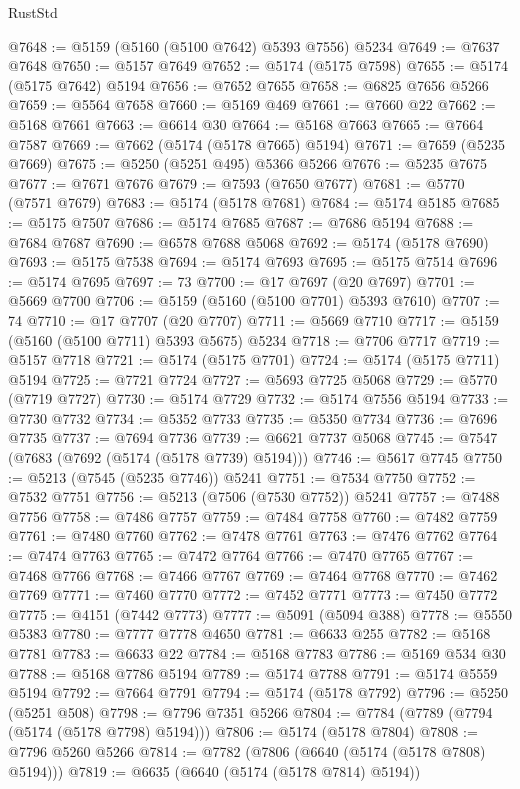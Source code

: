\begin{lexlean}{RustStd}
\begin{coremodule}
@7648 := @5159 (@5160 (@5100 @7642) @5393 @7556) @5234
@7649 := @7637 @7648
@7650 := @5157 @7649
@7652 := @5174 (@5175 @7598)
@7655 := @5174 (@5175 @7642) @5194
@7656 := @7652 @7655
@7658 := @6825 @7656 @5266
@7659 := @5564 @7658
@7660 := @5169 @469
@7661 := @7660 @22
@7662 := @5168 @7661
@7663 := @6614 @30
@7664 := @5168 @7663
@7665 := @7664 @7587
@7669 := @7662 (@5174 (@5178 @7665) @5194)
@7671 := @7659 (@5235 @7669)
@7675 := @5250 (@5251 @495) @5366 @5266
@7676 := @5235 @7675
@7677 := @7671 @7676
@7679 := @7593 (@7650 @7677)
@7681 := @5770 (@7571 @7679)
@7683 := @5174 (@5178 @7681)
@7684 := @5174 @5185
@7685 := @5175 @7507
@7686 := @5174 @7685
@7687 := @7686 @5194
@7688 := @7684 @7687
@7690 := @6578 @7688 @5068
@7692 := @5174 (@5178 @7690)
@7693 := @5175 @7538
@7694 := @5174 @7693
@7695 := @5175 @7514
@7696 := @5174 @7695
@7697 := 73
@7700 := @17 @7697 (@20 @7697)
@7701 := @5669 @7700
@7706 := @5159 (@5160 (@5100 @7701) @5393 @7610)
@7707 := 74
@7710 := @17 @7707 (@20 @7707)
@7711 := @5669 @7710
@7717 := @5159 (@5160 (@5100 @7711) @5393 @5675) @5234
@7718 := @7706 @7717
@7719 := @5157 @7718
@7721 := @5174 (@5175 @7701)
@7724 := @5174 (@5175 @7711) @5194
@7725 := @7721 @7724
@7727 := @5693 @7725 @5068
@7729 := @5770 (@7719 @7727)
@7730 := @5174 @7729
@7732 := @5174 @7556 @5194
@7733 := @7730 @7732
@7734 := @5352 @7733
@7735 := @5350 @7734
@7736 := @7696 @7735
@7737 := @7694 @7736
@7739 := @6621 @7737 @5068
@7745 := @7547 (@7683 (@7692 (@5174 (@5178 @7739) @5194)))
@7746 := @5617 @7745
@7750 := @5213 (@7545 (@5235 @7746)) @5241
@7751 := @7534 @7750
@7752 := @7532 @7751
@7756 := @5213 (@7506 (@7530 @7752)) @5241
@7757 := @7488 @7756
@7758 := @7486 @7757
@7759 := @7484 @7758
@7760 := @7482 @7759
@7761 := @7480 @7760
@7762 := @7478 @7761
@7763 := @7476 @7762
@7764 := @7474 @7763
@7765 := @7472 @7764
@7766 := @7470 @7765
@7767 := @7468 @7766
@7768 := @7466 @7767
@7769 := @7464 @7768
@7770 := @7462 @7769
@7771 := @7460 @7770
@7772 := @7452 @7771
@7773 := @7450 @7772
@7775 := @4151 (@7442 @7773)
@7777 := @5091 (@5094 @388)
@7778 := @5550 @5383
@7780 := @7777 @7778 @4650
@7781 := @6633 @255
@7782 := @5168 @7781
@7783 := @6633 @22
@7784 := @5168 @7783
@7786 := @5169 @534 @30
@7788 := @5168 @7786 @5194
@7789 := @5174 @7788
@7791 := @5174 @5559 @5194
@7792 := @7664 @7791
@7794 := @5174 (@5178 @7792)
@7796 := @5250 (@5251 @508)
@7798 := @7796 @7351 @5266
@7804 := @7784 (@7789 (@7794 (@5174 (@5178 @7798) @5194)))
@7806 := @5174 (@5178 @7804)
@7808 := @7796 @5260 @5266
@7814 := @7782 (@7806 (@6640 (@5174 (@5178 @7808) @5194)))
@7819 := @6635 (@6640 (@5174 (@5178 @7814) @5194))

\end{coremodule}
\end{lexlean}
